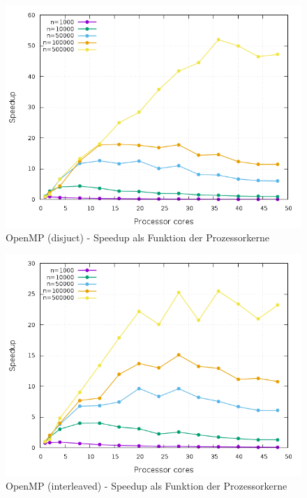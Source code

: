 \begin{figure}[htbp]
	\centering
	\includegraphics[width=404pt]{resources/plots/OpenMP_Disjunct_sizes.png}
	\caption{OpenMP (disjuct) - Speedup als Funktion der Prozessorkerne}
	\label{OpenMP_Disjunct_sizes}
\end{figure}


\begin{figure}[htbp]
	\centering
	\includegraphics[width=404pt]{resources/plots/OpenMP_Interleaved_sizes.png}
	\caption{OpenMP (interleaved) - Speedup als Funktion der Prozessorkerne}
	\label{OpenMP_Interleaved_sizes}
\end{figure}


